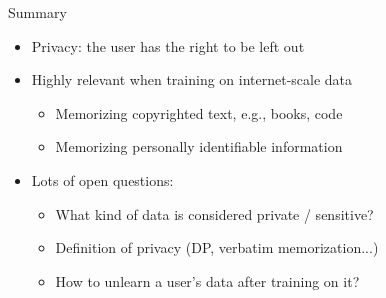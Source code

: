 \documentclass[usenames,dvipsnames,notes,11pt,aspectratio=169,hyperref={colorlinks=true, linkcolor=blue}]{beamer}
\begin{document}
\begin{frame}
    {Summary}
    \begin{itemize}
        \item Privacy: the user has the right to be left out
        \item Highly relevant when training on internet-scale data
            \begin{itemize}
                \item Memorizing copyrighted text, e.g., books, code
                \item Memorizing personally identifiable information
            \end{itemize}
        \item Lots of open questions:
            \begin{itemize}
                \item What kind of data is considered private / sensitive?
                \item Definition of privacy (DP, verbatim memorization...)
                \item How to unlearn a user's data after training on it? 
            \end{itemize}
    \end{itemize}
\end{frame}
\end{document}
